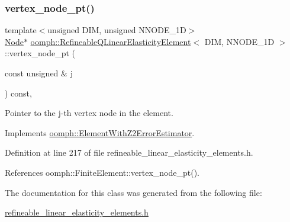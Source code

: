 \mbox{\label{classoomph_1_1RefineableQLinearElasticityElement_ac2b4e5b6485c01414063e1a05ab8da20}} 
\subsubsection{\texorpdfstring{vertex\+\_\+node\+\_\+pt()}{vertex\_node\_pt()}}
{\footnotesize\ttfamily template$<$unsigned D\+IM, unsigned N\+N\+O\+D\+E\+\_\+1D$>$ \\
\hyperlink{classoomph_1_1Node}{Node}$\ast$ \hyperlink{classoomph_1_1RefineableQLinearElasticityElement}{oomph\+::\+Refineable\+Q\+Linear\+Elasticity\+Element}$<$ D\+IM, N\+N\+O\+D\+E\+\_\+1D $>$\+::vertex\+\_\+node\+\_\+pt (\begin{DoxyParamCaption}\item[{const unsigned \&}]{j }\end{DoxyParamCaption}) const\hspace{0.3cm}{\ttfamily [inline]}, {\ttfamily [virtual]}}



Pointer to the j-\/th vertex node in the element. 



Implements \hyperlink{classoomph_1_1ElementWithZ2ErrorEstimator_a0eedccc33519f852c5dc2055ddf2774b}{oomph\+::\+Element\+With\+Z2\+Error\+Estimator}.



Definition at line 217 of file refineable\+\_\+linear\+\_\+elasticity\+\_\+elements.\+h.



References oomph\+::\+Finite\+Element\+::vertex\+\_\+node\+\_\+pt().



The documentation for this class was generated from the following file\+:\begin{DoxyCompactItemize}
\item 
\hyperlink{refineable__linear__elasticity__elements_8h}{refineable\+\_\+linear\+\_\+elasticity\+\_\+elements.\+h}\end{DoxyCompactItemize}
